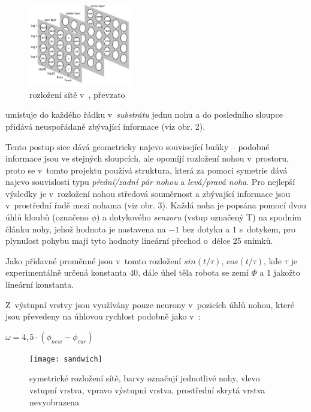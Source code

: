 \documentclass[a4]{article}
\begin{document}
\begin{figure}
  \begin{center}
    \includegraphics[width=0.4\textwidth]{clunenet}
  \end{center}
  \caption{rozložení sítě v~\cite{clunegait}, převzato \cite{clunegait}}
\end{figure}

\cite{clunegait} umisťuje do každého řádku v~\emph{substrátu} jednu nohu a do posledního sloupce přidává neuspořádaně zbývající informace (viz obr. 2).\par

Tento postup sice dává geometricky najevo související buňky -- podobné informace jsou ve stejných sloupcích, ale opomíjí rozložení nohou v~prostoru, proto se v~tomto projektu používá struktura, která za pomoci symetrie dává najevo souvislosti typu \emph{přední/zadní pár nohou} a \emph{levá/pravá noha}. Pro nejlepší výsledky je v~rozložení nohou středová souměrnost a zbývající informace jsou v~prostřední řadě mezi nohama (viz obr. 3). Každá noha je popsána pomocí dvou úhlů kloubů (označeno $\phi$) a dotykového \emph{senzoru} (vstup označený T) na spodním článku nohy, jehož hodnota je nastavena na $-1$ bez dotyku a $1$ s~dotykem, pro plynulost pohybu mají tyto hodnoty lineární přechod o~délce 25 snímků.\par
Jako přídavné proměnné jsou v~tomto rozložení $sin(t/\tau)$, $cos(t/\tau)$, kde $\tau$ je experimentálně určená konstanta 40, dále úhel těla robota se zemí $\Phi$ a $1$ jakožto lineární konstanta.\par
Z~výstupní vrstvy jsou využívány pouze neurony v~pozicích úhlů nohou, které jsou převedeny na úhlovou rychlost podobně jako v~\cite{clunegait}:
\begin{center}
$\omega = 4,5\cdot(\phi_{new} - \phi_{cur})$
\end{center}
\begin{figure}
  \begin{center}
    \texttt{[image: sandwich]}
  \end{center}
  \caption{symetrické rozložení sítě, barvy označují jednotlivé nohy, vlevo vstupní vrstva, vpravo výstupní vrstva, prostřední skrytá vrstva nevyobrazena}
\end{figure}
\newpage
\end{document}
